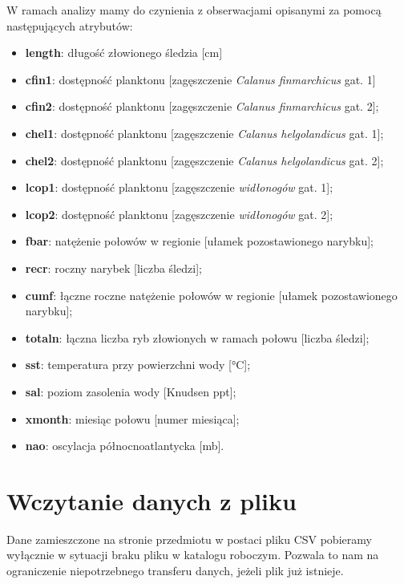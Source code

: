 \documentclass[]{article}
\providecommand{\tightlist}{%
  \setlength{\itemsep}{0pt}\setlength{\parskip}{0pt}}
\begin{document}
W ramach analizy mamy do czynienia z obserwacjami opisanymi za pomocą
następujących atrybutów:

\begin{itemize}
\tightlist
\item
  \textbf{length}: długość złowionego śledzia {[}cm{]}
\item
  \textbf{cfin1}: dostępność planktonu {[}zagęszczenie \emph{Calanus
  finmarchicus} gat. 1{]}
\item
  \textbf{cfin2}: dostępność planktonu {[}zagęszczenie \emph{Calanus
  finmarchicus} gat. 2{]};
\item
  \textbf{chel1}: dostępność planktonu {[}zagęszczenie \emph{Calanus
  helgolandicus} gat. 1{]};
\item
  \textbf{chel2}: dostępność planktonu {[}zagęszczenie \emph{Calanus
  helgolandicus} gat. 2{]};
\item
  \textbf{lcop1}: dostępność planktonu {[}zagęszczenie \emph{widłonogów}
  gat. 1{]};
\item
  \textbf{lcop2}: dostępność planktonu {[}zagęszczenie \emph{widłonogów}
  gat. 2{]};
\item
  \textbf{fbar}: natężenie połowów w regionie {[}ułamek pozostawionego
  narybku{]};
\item
  \textbf{recr}: roczny narybek {[}liczba śledzi{]};
\item
  \textbf{cumf}: łączne roczne natężenie połowów w regionie {[}ułamek
  pozostawionego narybku{]};
\item
  \textbf{totaln}: łączna liczba ryb złowionych w ramach połowu
  {[}liczba śledzi{]};
\item
  \textbf{sst}: temperatura przy powierzchni wody {[}°C{]};
\item
  \textbf{sal}: poziom zasolenia wody {[}Knudsen ppt{]};
\item
  \textbf{xmonth}: miesiąc połowu {[}numer miesiąca{]};
\item
  \textbf{nao}: oscylacja północnoatlantycka {[}mb{]}.
\end{itemize}

\hypertarget{wczytanie-danych-z-pliku}{%
\section{Wczytanie danych z pliku}\label{wczytanie-danych-z-pliku}}

Dane zamieszczone na stronie przedmiotu w postaci pliku CSV pobieramy
wyłącznie w sytuacji braku pliku w katalogu roboczym. Pozwala to nam na
ograniczenie niepotrzebnego transferu danych, jeżeli plik już istnieje.
\end{document}
